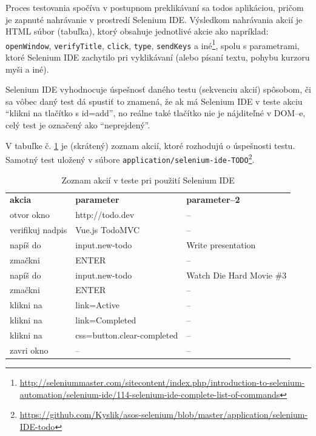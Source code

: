 Proces testovania spočíva v postupnom preklikávaní sa todos aplikáciou, pričom je zapnuté nahrávanie v prostredí Selenium \acs{IDE}. Výsledkom nahrávania akcií je HTML súbor (tabuľka), ktorý obsahuje jednotlivé akcie ako napríklad: \texttt{openWindow}, \texttt{verifyTitle}, \texttt{click}, \texttt{type}, \texttt{sendKeys} a iné\footnote{\url{http://seleniummaster.com/sitecontent/index.php/introduction-to-selenium-automation/selenium-ide/114-selenium-ide-complete-list-of-commands}}, spolu s parametrami, ktoré Selenium \acs{IDE} zachytilo pri vyklikávaní (alebo písaní textu, pohybu kurzoru myši a iné). 

Selenium \acs{IDE} vyhodnocuje úspešnosť daného testu (sekvenciu akcií) spôsobom, či sa vôbec daný test dá spustiť to znamená, že ak má Selenium \acs{IDE} v teste akciu ``klikni na tlačítko s id=add'', no reálne také tlačítko nie je nájditeľné v \acs{DOM}--e, celý test je označený ako ``neprejdený''. 

V tabuľke č. \ref{table:action-list-ide} je (skrátený) zoznam akcií, ktoré rozhodujú o úspešnosti testu. Samotný test uložený v súbore \texttt{application/selenium-ide-TODO}\footnote{\url{https://github.com/Kyslik/asos-selenium/blob/master/application/selenium-IDE-todo}}.

\begin{table}[h]
\centering
\caption{Zoznam akcií v teste pri použití Selenium IDE}
\label{table:action-list-ide}
\begin{tabular}{lll}
\textbf{akcia}   & \textbf{parameter}         & \textbf{parameter--2}    \\
otvor okno       & http://todo.dev 			  & --                       \\
verifikuj nadpis & Vue.js   TodoMVC           & --                       \\
napíš do         & input.new-todo             & Write presentation       \\
zmačkni          & ENTER                      & --                       \\
napíš do         & input.new-todo             & Watch Die Hard Movie \#3 \\
zmačkni          & ENTER                      & --                       \\
klikni na        & link=Active                & --                       \\
klikni na        & link=Completed             & --                       \\
klikni na        & css=button.clear-completed & --                       \\
zavri okno       & --						  & --                        
\end{tabular}
\end{table}
